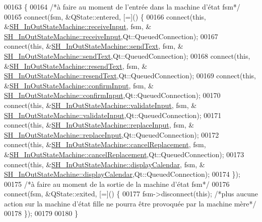 \begin{DoxyCode}
00163 \{
00164     \textcolor{comment}{/*à faire au moment de l'entrée dans la machine d'état fsm*/}
00165     connect(fsm, &QState::entered, [=]() \{
00166         connect(\textcolor{keyword}{this}, &\hyperlink{classSH__InOutStateMachine_a037ed5e13ecfae2123a8d4940292e410}{SH\_InOutStateMachine::receiveInput}, fsm, &
      \hyperlink{classSH__InOutStateMachine_a037ed5e13ecfae2123a8d4940292e410}{SH\_InOutStateMachine::receiveInput},Qt::QueuedConnection);
00167         connect(\textcolor{keyword}{this}, &\hyperlink{classSH__InOutStateMachine_a5e7f5958bae31696b6a8deab94ad2b4f}{SH\_InOutStateMachine::sendText}, fsm, &
      \hyperlink{classSH__InOutStateMachine_a5e7f5958bae31696b6a8deab94ad2b4f}{SH\_InOutStateMachine::sendText},Qt::QueuedConnection);
00168         connect(\textcolor{keyword}{this}, &\hyperlink{classSH__InOutStateMachine_a526822c66b46aa0cd81ba4473fa5573f}{SH\_InOutStateMachine::resendText}, fsm, &
      \hyperlink{classSH__InOutStateMachine_a526822c66b46aa0cd81ba4473fa5573f}{SH\_InOutStateMachine::resendText},Qt::QueuedConnection);
00169         connect(\textcolor{keyword}{this}, &\hyperlink{classSH__InOutStateMachine_a7f7d9c9300c1d05bce2c26029f28cc31}{SH\_InOutStateMachine::confirmInput}, fsm, &
      \hyperlink{classSH__InOutStateMachine_a7f7d9c9300c1d05bce2c26029f28cc31}{SH\_InOutStateMachine::confirmInput},Qt::QueuedConnection);
00170         connect(\textcolor{keyword}{this}, &\hyperlink{classSH__InOutStateMachine_aec1b3fef3c1f82499aa1f73beaecd08a}{SH\_InOutStateMachine::validateInput}, fsm, &
      \hyperlink{classSH__InOutStateMachine_aec1b3fef3c1f82499aa1f73beaecd08a}{SH\_InOutStateMachine::validateInput},Qt::QueuedConnection);
00171         connect(\textcolor{keyword}{this}, &\hyperlink{classSH__InOutStateMachine_a9fa5db44086de2576c812f631aa4f60a}{SH\_InOutStateMachine::replaceInput}, fsm, &
      \hyperlink{classSH__InOutStateMachine_a9fa5db44086de2576c812f631aa4f60a}{SH\_InOutStateMachine::replaceInput},Qt::QueuedConnection);
00172         connect(\textcolor{keyword}{this}, &\hyperlink{classSH__InOutStateMachine_a035d37535533d4805fe2606f38c19380}{SH\_InOutStateMachine::cancelReplacement}, fsm,
       &\hyperlink{classSH__InOutStateMachine_a035d37535533d4805fe2606f38c19380}{SH\_InOutStateMachine::cancelReplacement},Qt::QueuedConnection);
00173         connect(\textcolor{keyword}{this}, &\hyperlink{classSH__InOutStateMachine_ab3a12d1f9b658d8ffdc17669a6c065f2}{SH\_InOutStateMachine::displayCalendar}, fsm, &
      \hyperlink{classSH__InOutStateMachine_ab3a12d1f9b658d8ffdc17669a6c065f2}{SH\_InOutStateMachine::displayCalendar},Qt::QueuedConnection);
00174     \});
00175     \textcolor{comment}{/*à faire au moment de la sortie de la machine d'état fsm*/}
00176     connect(fsm, &QState::exited, [=]() \{
00177         fsm->disconnect(\textcolor{keyword}{this}); \textcolor{comment}{/*plus aucune action sur la machine d'état fille ne pourra être provoquée
       par la machine mère*/}
00178     \});
00179 
00180 \}
\end{DoxyCode}


